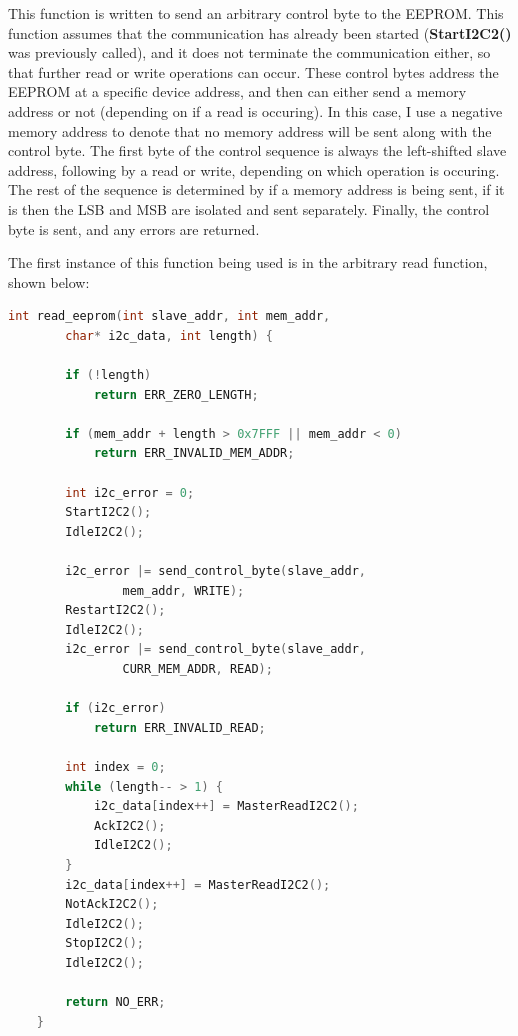 \documentclass[a4paper, 12pt]{article}
\begin{document}
This function is written to send an arbitrary control byte to the EEPROM. This function assumes that the communication has already been started (\textbf{StartI2C2()} was previously called), and it does not terminate the communication either, so that further read or write operations can occur. These control bytes address the EEPROM at a specific device address, and then can either send a memory address or not (depending on if a read is occuring). In this case, I use a negative memory address to denote that no memory address will be sent along with the control byte. The first byte of the control sequence is always the left-shifted slave address, following by a read or write, depending on which operation is occuring. The rest of the sequence is determined by if a memory address is being sent, if it is then the LSB and MSB are isolated and sent separately. Finally, the control byte is sent, and any errors are returned.

The first instance of this function being used is in the arbitrary read function, shown below:

	\begin{mdframed}[backgroundcolor=code-gray, roundcorner=10pt,
								innerleftmargin=5, innertopmargin=5, innerbottommargin=5]	
	\begin{lstlisting}[language=C, caption=Arbitrary EEPROM Read, tabsize=2]
	int read_eeprom(int slave_addr, int mem_addr,
		char* i2c_data, int length) {
		
		if (!length)
			return ERR_ZERO_LENGTH;

		if (mem_addr + length > 0x7FFF || mem_addr < 0)
			return ERR_INVALID_MEM_ADDR;

		int i2c_error = 0;
		StartI2C2();
		IdleI2C2();

		i2c_error |= send_control_byte(slave_addr,
				mem_addr, WRITE);
		RestartI2C2();
		IdleI2C2();
		i2c_error |= send_control_byte(slave_addr,
				CURR_MEM_ADDR, READ);

		if (i2c_error)
			return ERR_INVALID_READ;
	
		int index = 0;
		while (length-- > 1) {
			i2c_data[index++] = MasterReadI2C2();
			AckI2C2();
			IdleI2C2();
		}
		i2c_data[index++] = MasterReadI2C2();
		NotAckI2C2();
		IdleI2C2();
		StopI2C2();
		IdleI2C2();

		return NO_ERR;
	}
	\end{lstlisting}
	\end{mdframed}
\end{document}
